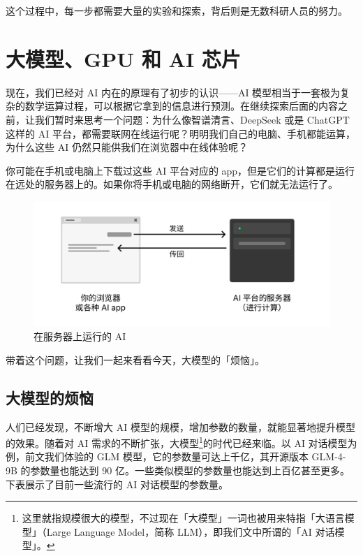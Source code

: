 这个过程中，每一步都需要大量的实验和探索，背后则是无数科研人员的努力。

\section{大模型、GPU 和 AI 芯片}

现在，我们已经对 AI 内在的原理有了初步的认识——AI 模型相当于一套极为复杂的数学运算过程，可以根据它拿到的信息进行预测。在继续探索后面的内容之前，让我们暂时来思考一个问题：为什么像智谱清言、DeepSeek 或是 ChatGPT 这样的 AI 平台，都需要联网在线运行呢？明明我们自己的电脑、手机都能运算，为什么这些 AI 仍然只能供我们在浏览器中在线体验呢？

\begin{note}
  你可能在手机或电脑上下载过这些 AI 平台对应的 app，但是它们的计算都是运行在远处的服务器上的。如果你将手机或电脑的网络断开，它们就无法运行了。
\end{note}

\begin{figure}[htb!]
  \centering
  \includegraphics[width=.6\textwidth]{assets/surpass/AI_running_on_server.pdf}
  \caption{在服务器上运行的 AI}
  \label{fig:AI_running_on_server}
\end{figure}

带着这个问题，让我们一起来看看今天，大模型的「烦恼」。

\subsection{大模型的烦恼}

人们已经发现，不断增大 AI 模型的规模，增加参数的数量，就能显著地提升模型的效果。随着对 AI 需求的不断扩张，大模型\footnote{这里就指规模很大的模型，不过现在「大模型」一词也被用来特指「大语言模型」（Large Language Model，简称 LLM），即我们文中所谓的「AI 对话模型」。}的时代已经来临。以 AI 对话模型为例，前文我们体验的 GLM 模型，它的参数量可达上千亿，其开源版本 GLM-4-9B 的参数量也能达到 90 亿。一些类似模型的参数量也能达到上百亿甚至更多。下表展示了目前一些流行的 AI 对话模型的参数量。

